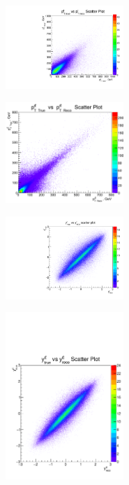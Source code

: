 \begin{figure}[t]
\centering
\begin{subfigure}
  \centering
  \includegraphics[width=0.49\textwidth]{05_kinReco/plots/scatter/pt-t.pdf}
\end{subfigure}
\begin{subfigure}
  \centering
  \includegraphics[width=0.49\textwidth]{05_kinReco/plots/scatter/pTtt-scaterPlot.png}
\end{subfigure}
\begin{subfigure}
  \centering
  \includegraphics[width=0.49\textwidth]{05_kinReco/plots/scatter/y-t.pdf}
\end{subfigure}
\begin{subfigure}
  \centering
  \includegraphics[width=0.49\textwidth]{05_kinReco/plots/scatter/y-tt.pdf}

\end{subfigure}
\end{figure}
